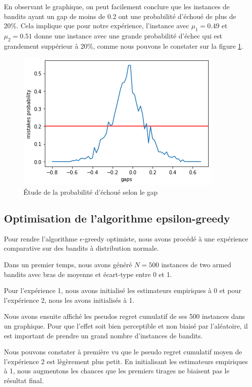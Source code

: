 \documentclass[letterpaper,11pt]{article}
\begin{document}
En observant le graphique, on peut facilement conclure que les instances de bandits ayant un gap de moins de 0.2 ont une probabilité d'échoué de plus de 20\%. Cela implique que pour notre expérience, l'instance avec $\mu_1 = 0.49$ et $\mu_2 = 0.51$ donne une instance avec une grande probabilité d'échec qui est grandement suppérieur à 20\%, comme nous pouvons le constater sur la figure \ref{fig: no1_1}.

\begin{figure}[H]
\caption{Étude de la probabilité d'échoué selon le gap}
\label{fig: no1_1}
\begin{center}
\includegraphics[scale=0.8]{fig1_no1_1.png}
\end{center}
\end{figure}


\subsection{Optimisation de l'algorithme epsilon-greedy}
Pour rendre l'algorithme $\epsilon$-greedy optimiste, nous avons procédé à une expérience comparative sur des bandits à distribution normale.

Dans un premier temps, nous avons généré $N=500$ instances de two armed bandits avec bras de moyenne et écart-type entre 0 et 1.

Pour l'expérience 1, nous avons initialisé les estimateurs empiriques à 0 et pour l'expérience 2, nous les avons initialisés à 1.

Nous avons ensuite affiché les pseudos regret cumulatif de ses 500 instances dans un graphique.
Pour que l'effet soit bien perceptible et non biaisé par l'aléatoire, il est important de prendre un grand nombre d'instances de bandits.

Nous pouvons constater à première vu que le pseudo regret cumulatif moyen de l'expérience 2 est lègèrement plus petit.
En initialisant les estimateurs empiriques à 1, nous augmentons les chances que les premiers tirages ne biaisent pas le résultat final.
\end{document}
